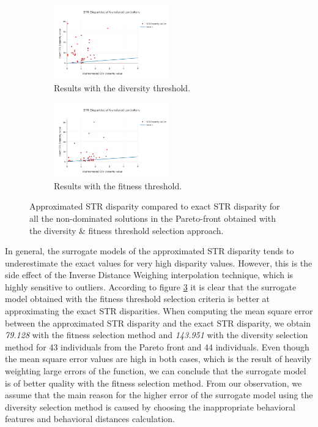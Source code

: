 \begin{figure}[H]
    \centering
    \begin{subfigure}[b]{0.8\textwidth}
    	\centering
        \includegraphics[width=5cm]{include/images/moea_worst_hofs.PNG}
        \caption{Results with the diversity threshold.}
        \label{fig:bad_str_disparity}
    \end{subfigure}
    \begin{subfigure}[b]{0.8\textwidth}
    	\centering
        \includegraphics[width=5cm]{include/images/moea_best_hofs.PNG}
        \caption{Results with the fitness threshold.}
        \label{fig:good_str_disparity}
    \end{subfigure}
    \caption{Approximated STR disparity compared to exact STR disparity for all the non-dominated solutions in the Pareto-front obtained with the diversity & fitness threshold selection approach.}
	\label{fig:str_disparities}
\end{figure}

In general, the surrogate models of the approximated STR disparity tends to underestimate the exact values for very high disparity values. However, this is the side effect of the Inverse Distance Weighing interpolation technique, which is highly sensitive to outliers. According to figure \ref{fig:str_disparities} it is clear that the surrogate model obtained with the fitness threshold selection criteria is better at approximating the exact STR disparities. When computing the mean square error between the approximated STR disparity and the exact STR disparity, we obtain \textit{79.128} with the fitness selection method and \textit{143.951} with the diversity selection method for 43 individuals from the Pareto front and 44 individuals. Even though the mean square error values are high in both cases, which is the result of heavily weighting large errors of the function, we can conclude that the surrogate model is of better quality with the fitness selection method. From our observation, we assume that the main reason for the higher error of the surrogate model using the diversity selection method is caused by choosing the inappropriate behavioral features and behavioral distances calculation.

